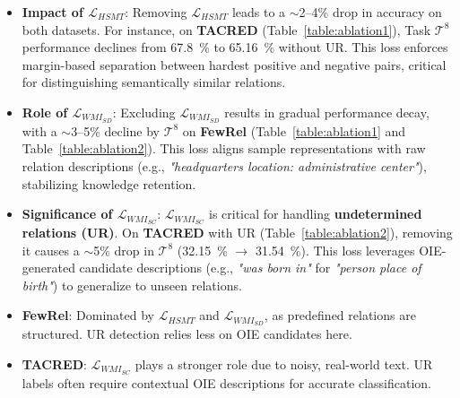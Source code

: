 \begin{itemize}
    \item \textbf{Impact of $\mathcal{L}_{HSMT}$}: 
    Removing $\mathcal{L}_{HSMT}$ leads to a $\sim$2--4\% drop in accuracy on both datasets. For instance, on \textbf{TACRED} (Table~\ref{table:ablation1}), Task $\mathcal{T}^8$ performance declines from \SI{67.8}{\%} to \SI{65.16}{\%} without UR. This loss enforces margin-based separation between hardest positive and negative pairs, critical for distinguishing semantically similar relations.
    
    \item \textbf{Role of $\mathcal{L}_{WMI_{SD}}$}: 
    Excluding $\mathcal{L}_{WMI_{SD}}$ results in gradual performance decay, with a $\sim$3--5\% decline by $\mathcal{T}^8$ on \textbf{FewRel} (Table~\ref{table:ablation1} and Table~\ref{table:ablation2}). This loss aligns sample representations with raw relation descriptions (e.g., \textit{"headquarters location: administrative center"}), stabilizing knowledge retention.
    
    \item \textbf{Significance of $\mathcal{L}_{WMI_{SC}}$}: 
    $\mathcal{L}_{WMI_{SC}}$ is critical for handling \textbf{undetermined relations (UR)}. On \textbf{TACRED} with UR (Table~\ref{table:ablation2}), removing it causes a $\sim$5\% drop in $\mathcal{T}^8$ (\SI{32.15}{\%} $\rightarrow$ \SI{31.54}{\%}). This loss leverages OIE-generated candidate descriptions (e.g., \textit{"was born in"} for \textit{"person place of birth"}) to generalize to unseen relations.
\end{itemize}

\begin{itemize}
    \item \textbf{FewRel}: Dominated by $\mathcal{L}_{HSMT}$ and $\mathcal{L}_{WMI_{SD}}$, as predefined relations are structured. UR detection relies less on OIE candidates here.
    \item \textbf{TACRED}: $\mathcal{L}_{WMI_{SC}}$ plays a stronger role due to noisy, real-world text. UR labels often require contextual OIE descriptions for accurate classification.
\end{itemize}

